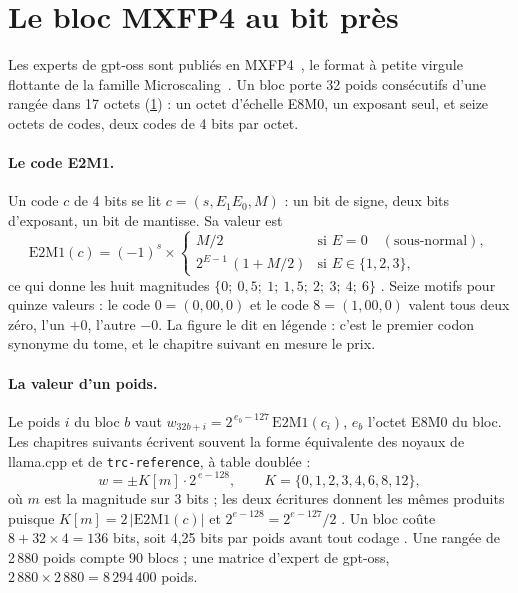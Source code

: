 \section{Le bloc MXFP4 au bit près}\label{t3que:sec:mxfp4}

Les experts de gpt-oss sont publiés en MXFP4~\cite{openai2025gptoss}, le format à petite virgule flottante de la famille Microscaling~\cite{rouhani2023microscaling,ocpmx2023}. Un bloc porte 32 poids consécutifs d'une rangée dans 17 octets (\cref{fig:t3-ecl-bloc}) : un octet d'échelle E8M0, un exposant seul, et seize octets de codes, deux codes de 4 bits par octet.

\begin{figure}[tbp]
\centering
\GrapheEclBloc
{}
\label{fig:t3-ecl-bloc}
\end{figure}

\paragraph{Le code E2M1.} Un code $c$ de 4 bits se lit $c = (s, E_1E_0, M)$ : un bit de signe, deux bits d'exposant, un bit de mantisse. Sa valeur est
\begin{equation}\label{t3que:eq:e2m1}
\mathrm{E2M1}(c) = (-1)^{s} \times
\begin{cases}
M/2 & \text{si } E = 0 \quad(\text{sous-normal}),\\
2^{E-1}\,(1 + M/2) & \text{si } E \in \{1, 2, 3\},
\end{cases}
\end{equation}
ce qui donne les huit magnitudes $\{0;\ 0{,}5;\ 1;\ 1{,}5;\ 2;\ 3;\ 4;\ 6\}$ \calc. Seize motifs pour quinze valeurs : le code $0 = (0, 00, 0)$ et le code $8 = (1, 00, 0)$ valent tous deux zéro, l'un $+0$, l'autre $-0$. La figure le dit en légende : c'est le premier codon synonyme du tome, et le chapitre suivant en mesure le prix.

\paragraph{La valeur d'un poids.} Le poids $i$ du bloc $b$ vaut $w_{32b+i} = 2^{\,e_b - 127}\,\mathrm{E2M1}(c_i)$, $e_b$ l'octet E8M0 du bloc. Les chapitres suivants écrivent souvent la forme équivalente des noyaux de llama.cpp et de \texttt{trc-reference}, à table doublée :
\begin{equation}\label{t3que:eq:k}
w = \pm K[m]\cdot 2^{\,e-128}, \qquad K = \{0, 1, 2, 3, 4, 6, 8, 12\},
\end{equation}
où $m$ est la magnitude sur 3 bits ; les deux écritures donnent les mêmes produits puisque $K[m] = 2\,|\mathrm{E2M1}(c)|$ et $2^{e-128} = 2^{e-127}/2$ \calc. Un bloc coûte $8 + 32 \times 4 = 136$ bits, soit 4,25 bits par poids avant tout codage \calc. Une rangée de 2\,880 poids compte 90 blocs ; une matrice d'expert de gpt-oss, $2\,880 \times 2\,880 = 8\,294\,400$ poids.

